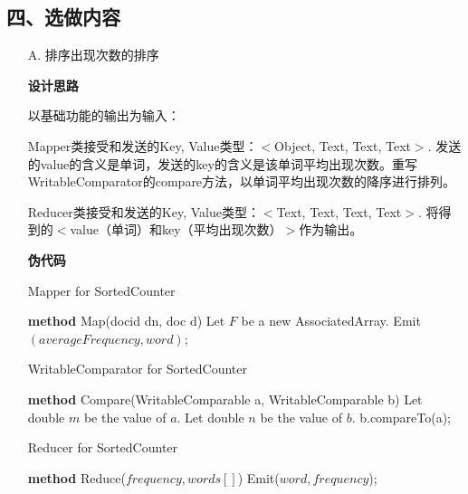 \documentclass[a4paper,UTF8]{article}
\theoremstyle{definition}
\begin{document}
\begin{CJK}{UTF8}{gkai}
\begin{CJK*}{UTF8}{gbsn}
\section*{四、选做内容}
\end{CJK*}
\begin{enumerate}
	\item[A.] 排序出现次数的排序	\par \textbf{设计思路}
	\par 以基础功能的输出为输入：
	\par Mapper类接受和发送的Key, Value类型：$<$Object, Text, Text, Text$>$. 发送的value的含义是单词，发送的key的含义是该单词平均出现次数。重写WritableComparator的compare方法，以单词平均出现次数的降序进行排列。
	\par Reducer类接受和发送的Key, Value类型：$<$Text, Text, Text, Text$>$. 将得到的$<$value（单词）和key（平均出现次数）$>$作为输出。
	\par \textbf{伪代码}
\begin{algorithm}[htb]
\caption{Mapper for SortedCounter}
\label{alg:Framwork}
\begin{algorithmic}[1] %
	 \STATE \textbf{method} Map(docid dn, doc d)
    \STATE Let $F$ be a new AssociatedArray.
	 	\STATE Emit$(averageFrequency, word)$;
	 \ENDFOR
	 \RETURN
\end{algorithmic}
\end{algorithm}
\begin{algorithm}[htb]
\caption{WritableComparator for SortedCounter}
\label{alg:Framwork}
\begin{algorithmic}[1] %
	 \STATE \textbf{method} Compare(WritableComparable a, WritableComparable b)
    \STATE Let double $m$ be the value of $a$.
 	\STATE Let double $n$ be the value of $b$.
	 \RETURN b.compareTo(a);
\end{algorithmic}
\end{algorithm}
\begin{algorithm}[htb]
\caption{Reducer for SortedCounter}
\label{alg:Framwork}
\begin{algorithmic}[1] %
	 \STATE \textbf{method} Reduce($frequency,words[]$)
		\STATE Emit($word, frequency$);
	 \ENDFOR
	 

\end{algorithmic}
\end{algorithm}
\end{enumerate}
\end{CJK}
\end{document}

